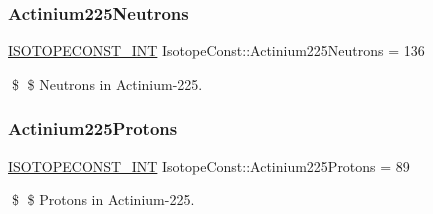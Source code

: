 \subsubsection{\texorpdfstring{Actinium225\+Neutrons}{Actinium225Neutrons}}
{\footnotesize\ttfamily \mbox{\hyperlink{group___isotope_const-_macros_ga5f18360b3e99483a35c32d789e62621c}{I\+S\+O\+T\+O\+P\+E\+C\+O\+N\+S\+T\+\_\+\+I\+NT}} Isotope\+Const\+::\+Actinium225\+Neutrons = 136}

\$ \$ Neutrons in Actinium-\/225. \mbox{\label{group___isotope_const-_actinium-_ac225_ga1e6ae191419ec6a4025a73639a84aeb3}} 
\subsubsection{\texorpdfstring{Actinium225\+Protons}{Actinium225Protons}}
{\footnotesize\ttfamily \mbox{\hyperlink{group___isotope_const-_macros_ga5f18360b3e99483a35c32d789e62621c}{I\+S\+O\+T\+O\+P\+E\+C\+O\+N\+S\+T\+\_\+\+I\+NT}} Isotope\+Const\+::\+Actinium225\+Protons = 89}

\$ \$ Protons in Actinium-\/225. 